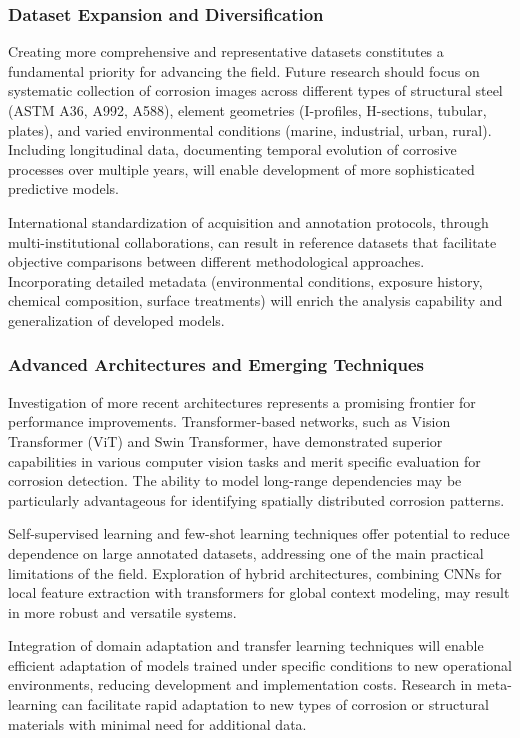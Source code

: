 \documentclass[12pt,a4paper,twoside]{article}
\begin{document}
\subsubsection{Dataset Expansion and Diversification}

Creating more comprehensive and representative datasets constitutes a fundamental priority for advancing the field. Future research should focus on systematic collection of corrosion images across different types of structural steel (ASTM A36, A992, A588), element geometries (I-profiles, H-sections, tubular, plates), and varied environmental conditions (marine, industrial, urban, rural). Including longitudinal data, documenting temporal evolution of corrosive processes over multiple years, will enable development of more sophisticated predictive models.

International standardization of acquisition and annotation protocols, through multi-institutional collaborations, can result in reference datasets that facilitate objective comparisons between different methodological approaches. Incorporating detailed metadata (environmental conditions, exposure history, chemical composition, surface treatments) will enrich the analysis capability and generalization of developed models.

\subsubsection{Advanced Architectures and Emerging Techniques}

Investigation of more recent architectures represents a promising frontier for performance improvements. Transformer-based networks, such as Vision Transformer (ViT) and Swin Transformer, have demonstrated superior capabilities in various computer vision tasks and merit specific evaluation for corrosion detection. The ability to model long-range dependencies may be particularly advantageous for identifying spatially distributed corrosion patterns.

Self-supervised learning and few-shot learning techniques offer potential to reduce dependence on large annotated datasets, addressing one of the main practical limitations of the field. Exploration of hybrid architectures, combining CNNs for local feature extraction with transformers for global context modeling, may result in more robust and versatile systems.

Integration of domain adaptation and transfer learning techniques will enable efficient adaptation of models trained under specific conditions to new operational environments, reducing development and implementation costs. Research in meta-learning can facilitate rapid adaptation to new types of corrosion or structural materials with minimal need for additional data.
\end{document}
